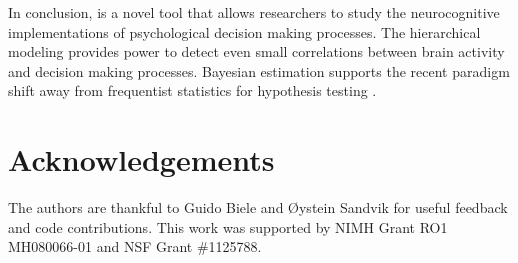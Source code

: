 \documentclass[letterpaper,10pt,english]{article}
\begin{document}
In conclusion,  is a novel tool that allows researchers to study the neurocognitive implementations of psychological decision making processes. The hierarchical modeling provides power to detect even small correlations between brain activity and decision making processes. Bayesian estimation supports the recent paradigm shift away from frequentist statistics for hypothesis testing \citep{Lindley65,Kruschke10,LeeWagenmakers13}.

\section*{Acknowledgements}
The authors are thankful to Guido Biele and Øystein Sandvik for useful feedback and code contributions. This work was supported by NIMH Grant RO1 MH080066-01 and NSF Grant \#1125788.




\renewcommand{\indexname}{Index}
\printindex
\end{document}
